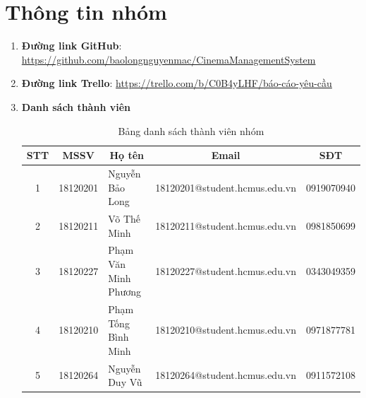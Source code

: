\documentclass[a4paper, 12pt]{article}
\begin{document}
    \section{Thông tin nhóm}
    \label{sec:info}
    \begin{enumerate}
        \item \textbf{Đường link GitHub}: \url{https://github.com/baolongnguyenmac/CinemaManagementSystem}
        \item \textbf{Đường link Trello}: \url{https://trello.com/b/C0B4yLHF/báo-cáo-yêu-cầu}
        \item \textbf{Danh sách thành viên}
        \begin{table}[H]
            \begin{tabular}{|c|c|l|c|c|}
            \hline
            STT & MSSV     & \multicolumn{1}{c|}{Họ tên} & Email                         & SĐT        \\ \hline
            1   & 18120201 & Nguyễn Bảo Long             & 18120201@student.hcmus.edu.vn & 0919070940 \\ \hline
            2   & 18120211 & Võ Thế Minh                 & 18120211@student.hcmus.edu.vn & 0981850699 \\ \hline
            3   & 18120227 & Phạm Văn Minh Phương        & 18120227@student.hcmus.edu.vn & 0343049359 \\ \hline
            4   & 18120210 & Phạm Tống Bình Minh         & 18120210@student.hcmus.edu.vn & 0971877781 \\ \hline
            5   & 18120264 & Nguyễn Duy Vũ               & 18120264@student.hcmus.edu.vn & 0911572108 \\ \hline
            \end{tabular}
            \caption{Bảng danh sách thành viên nhóm}
        \end{table}
    \end{enumerate}
    \clearpage
\end{document}
